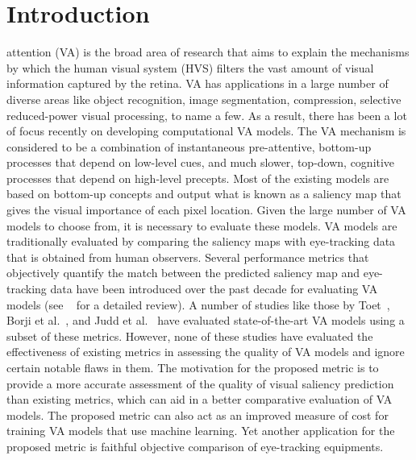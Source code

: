 \documentclass[12pt,onecolumn,journal,	draftclsnofoot]{IEEEtran}
\begin{document}
\section{Introduction}
% 
% 
% 
% 
 attention (VA) is the broad area of research that aims to explain the mechanisms by which the human visual system (HVS) filters the vast amount of visual information captured by the retina.
VA has applications in a large number of diverse areas like object recognition, image segmentation, compression, selective reduced-power visual processing, to name a few. As a result, there has been a lot of focus recently on developing computational VA models.  The VA mechanism is considered to be a combination of instantaneous pre-attentive, bottom-up processes that depend on low-level cues, and much slower, top-down, cognitive processes that depend on high-level precepts. Most of the existing models are based on bottom-up concepts and output what is known as a saliency map that gives the visual importance of each pixel location. Given the large number of VA models to choose from, it is necessary to evaluate these models. VA models are traditionally evaluated by comparing the saliency maps with eye-tracking data that is obtained from human observers. Several performance metrics that objectively quantify the match between the predicted saliency map and eye-tracking data have been introduced over the past decade for evaluating VA models (see ~\cite{borjireview} for a detailed review). A number of studies like those by Toet~\cite{Toet}, Borji et al.~\cite{borjieval}, and Judd et al.~\cite{judd2012benchmark} have evaluated state-of-the-art VA models using a subset of these metrics. However, none of these studies have evaluated the effectiveness of existing metrics in assessing the quality of VA models and ignore certain notable flaws in them.  The motivation for the proposed metric is to provide a more accurate assessment of the quality of visual saliency prediction than existing metrics, which can aid in a better comparative evaluation of VA models.  The proposed metric can also act as an improved measure of cost for training VA models that use machine learning.  Yet another application for the proposed metric is faithful objective comparison of eye-tracking equipments. 
\end{document}
